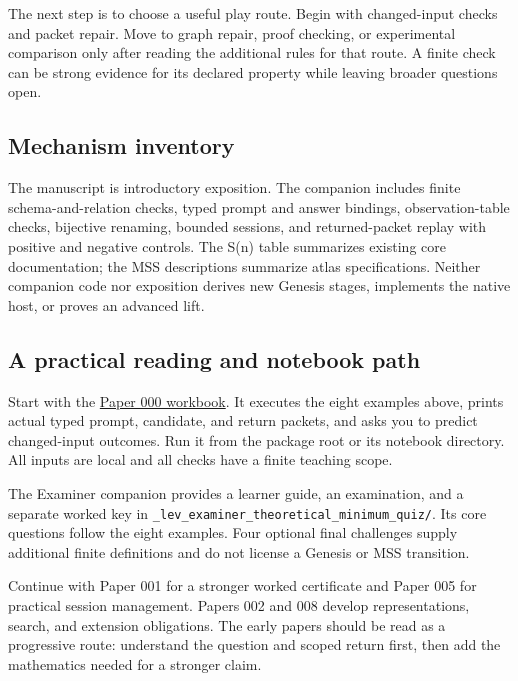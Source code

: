 \documentclass[
  11pt,
]{article}
\begin{document}
The next step is to choose a useful play route. Begin with changed-input
checks and packet repair. Move to graph repair, proof checking, or
experimental comparison only after reading the additional rules for that
route. A finite check can be strong evidence for its declared property
while leaving broader questions open.

\subsection{Mechanism inventory}\label{mechanism-inventory}

The manuscript is introductory exposition. The companion includes finite
schema-and-relation checks, typed prompt and answer bindings,
observation-table checks, bijective renaming, bounded sessions, and
returned-packet replay with positive and negative controls. The S(n)
table summarizes existing core documentation; the MSS descriptions
summarize atlas specifications. Neither companion code nor exposition
derives new Genesis stages, implements the native host, or proves an
advanced lift.

\subsection{A practical reading and notebook
path}\label{a-practical-reading-and-notebook-path}

Start with the
\href{https://github.com/dbccpage/the_symbol_game/blob/3f3399766108adc4c4e7615dce2573a57be57dd6/atlas/coda_atlas/symbol_game/000_pfp_introduction/jupyter_notebooks/000_from_marks_to_returned_packets.ipynb}{Paper
000 workbook}. It executes the eight examples above, prints actual typed
prompt, candidate, and return packets, and asks you to predict
changed-input outcomes. Run it from the package root or its notebook
directory. All inputs are local and all checks have a finite teaching
scope.

The Examiner companion provides a learner guide, an examination, and a
separate worked key in
\nolinkurl{_lev_examiner_theoretical_minimum_quiz/}. Its core questions
follow the eight examples. Four optional final challenges supply
additional finite definitions and do not license a Genesis or MSS
transition.

Continue with Paper 001 for a stronger worked certificate and Paper 005
for practical session management. Papers 002 and 008 develop
representations, search, and extension obligations. The early papers
should be read as a progressive route: understand the question and
scoped return first, then add the mathematics needed for a stronger
claim.
\end{document}
